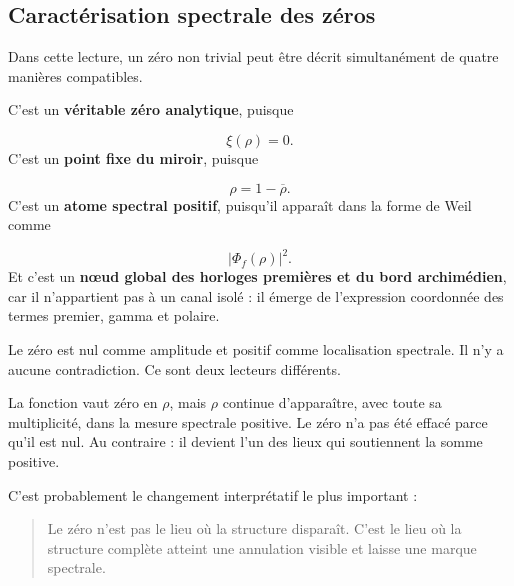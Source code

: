 \subsection{Caractérisation spectrale des zéros}
Dans cette lecture, un zéro non trivial peut être décrit simultanément de quatre manières compatibles.\par
C’est un \textbf{véritable zéro analytique}, puisque\par
\[
\xi(\rho)=0.
\]
C’est un \textbf{point fixe du miroir}, puisque\par
\[
\rho=1-\overline\rho.
\]
C’est un \textbf{atome spectral positif}, puisqu’il apparaît dans la forme de Weil comme\par
\[
|\Phi_f(\rho)|^2.
\]
Et c’est un \textbf{nœud global des horloges premières et du bord archimédien}, car il n’appartient pas à un canal isolé : il émerge de l’expression coordonnée des termes premier, gamma et polaire.\par
Le zéro est nul comme amplitude et positif comme localisation spectrale. Il n’y a aucune contradiction. Ce sont deux lecteurs différents.\par
La fonction vaut zéro en \(\rho\), mais \(\rho\) continue d’apparaître, avec toute sa multiplicité, dans la mesure spectrale positive. Le zéro n’a pas été effacé parce qu’il est nul. Au contraire : il devient l’un des lieux qui soutiennent la somme positive.\par
C’est probablement le changement interprétatif le plus important :\par
\begin{quote}
Le zéro n’est pas le lieu où la structure disparaît. C’est le lieu où la structure complète atteint une annulation visible et laisse une marque spectrale.\par
\end{quote}
